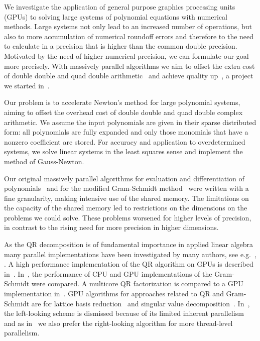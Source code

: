 \documentclass{article}
\begin{document}
We investigate the application of general purpose graphics processing
units (GPUs) to solving large systems of polynomial equations with
numerical methods.  Large systems not only lead to an increased
number of operations, but also to more accumulation of numerical roundoff
errors and therefore to the need to calculate in a precision that is higher
than the common double precision.  Motivated by the need of higher numerical
precision, we can formulate our goal more precisely.  With massively
parallel algorithms we aim to offset the extra cost of double double
and quad double arithmetic~\cite{HLB00,LHL10} 
and achieve quality up~\cite{Akl04}, a project we started in~\cite{VY10}.

  Our problem is to
accelerate Newton's method for large polynomial systems, aiming to offset
the overhead cost of double double and quad double complex arithmetic.
We assume the input polynomials are given in their sparse
distributed form: all polynomials are fully expanded and only those
monomials that have a nonzero coefficient are stored.
For accuracy and application to overdetermined systems, 
we solve linear systems in the least squares sense
and implement the method of Gauss-Newton.

Our original massively parallel algorithms for evaluation and differentiation
of polynomials~\cite{VY12} and for the modified Gram-Schmidt
method~\cite{VY13} were written with a fine granularity, making intensive 
use of the shared memory.  The limitations on the capacity of the shared 
memory led to restrictions on the dimensions on the problems we could solve.
These problems worsened for higher levels of precision, in contrast
to the rising need for more precision in higher dimensions.

  As the QR decomposition is of fundamental
importance in applied linear algebra many parallel implementations have
been investigated by many authors, see e.g.~\cite{AADFLTT11}, \cite{ABDK11}.
A high performance implementation of the QR algorithm 
on GPUs is described in~\cite{KCR09}.  
In~\cite{BASR12}, the performance of CPU and GPU implementations
of the Gram-Schmidt were compared.
A multicore QR factorization is compared to a GPU implementation
in~\cite{LD11}.
GPU algorithms for approaches related to QR and Gram-Schmidt
are for lattice basis reduction~\cite{BG12} and 
singular value decomposition~\cite{FMW12}.
In~\cite{VD08}, the left-looking scheme is dismissed because
of its limited inherent parallelism and as in~\cite{VD08}
we also prefer the right-looking algorithm for more thread-level
parallelism.
\end{document}

